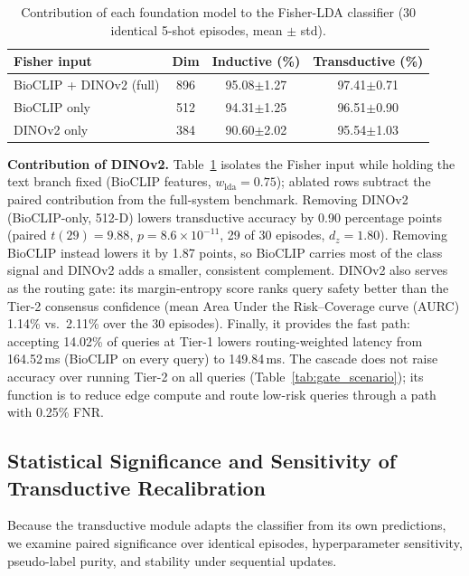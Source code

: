 \documentclass[preprint,12pt]{elsarticle}
\begin{document}
\begin{table}[htbp]
\caption{Contribution of each foundation model to the Fisher-LDA classifier (30 identical 5-shot episodes, mean $\pm$ std).}
\label{tab:feature_ablation}
\centering

\footnotesize
\setlength{\tabcolsep}{4pt}
\begin{tabular*}{\columnwidth}{@{\extracolsep{\fill}}lccc}
\toprule
\textbf{Fisher input} & \textbf{Dim} & \textbf{Inductive (\%)} & \textbf{Transductive (\%)} \\
\midrule
BioCLIP + DINOv2 (full) & 896 & 95.08$\pm$1.27 & 97.41$\pm$0.71 \\
BioCLIP only & 512 & 94.31$\pm$1.25 & 96.51$\pm$0.90 \\
DINOv2 only & 384 & 90.60$\pm$2.02 & 95.54$\pm$1.03 \\
\bottomrule
\end{tabular*}
\end{table}

\textbf{Contribution of DINOv2.} Table~\ref{tab:feature_ablation} isolates the Fisher input while holding the text branch fixed (BioCLIP features, $w_{\mathrm{lda}}=0.75$); ablated rows subtract the paired contribution from the full-system benchmark. Removing DINOv2 (BioCLIP-only, 512-D) lowers transductive accuracy by 0.90 percentage points (paired $t(29)=9.88$, $p=8.6\times10^{-11}$, 29 of 30 episodes, $d_z=1.80$). Removing BioCLIP instead lowers it by 1.87 points, so BioCLIP carries most of the class signal and DINOv2 adds a smaller, consistent complement. DINOv2 also serves as the routing gate: its margin-entropy score ranks query safety better than the Tier-2 consensus confidence (mean Area Under the Risk--Coverage curve (AURC) 1.14\% vs.\ 2.11\% over the 30 episodes). Finally, it provides the fast path: accepting 14.02\% of queries at Tier-1 lowers routing-weighted latency from 164.52\,ms (BioCLIP on every query) to 149.84\,ms. The cascade does not raise accuracy over running Tier-2 on all queries (Table~\ref{tab:gate_scenario}); its function is to reduce edge compute and route low-risk queries through a path with 0.25\% FNR.

\subsection{Statistical Significance and Sensitivity of Transductive Recalibration}
\label{sec:transductive_validation}
Because the transductive module adapts the classifier from its own predictions, we examine paired significance over identical episodes, hyperparameter sensitivity, pseudo-label purity, and stability under sequential updates.
\end{document}
